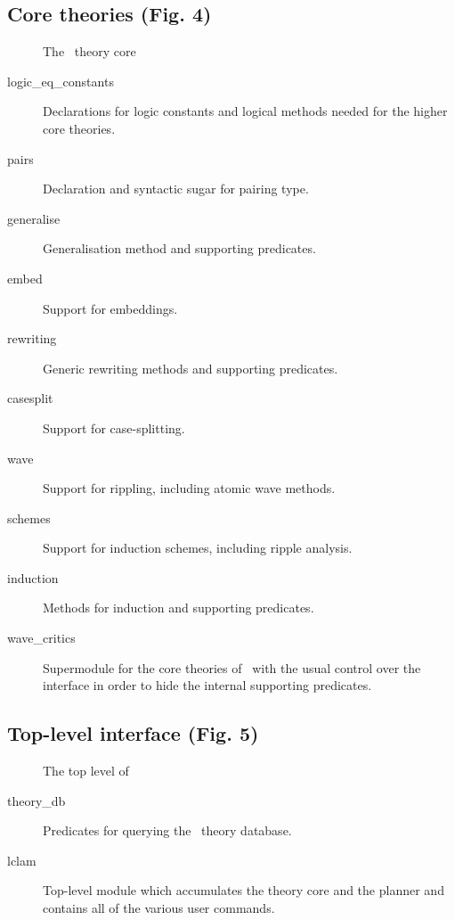 \subsection{Core theories (Fig. 4)}

\begin{figure}
\begin{center}
\end{center}
\caption{The \lclam\ theory core}
\end{figure}

\begin{description}
  
\item[logic\_eq\_constants] Declarations for logic constants and
  logical methods needed for the higher core theories.
\item[pairs] Declaration and syntactic sugar for pairing type.
\item[generalise] Generalisation method and supporting predicates.
\item[embed] Support for embeddings.
\item[rewriting] Generic rewriting methods and supporting predicates.
\item[casesplit] Support for case-splitting.
\item[wave] Support for rippling, including atomic wave methods.
\item[schemes] Support for induction schemes, including ripple analysis.
\item[induction] Methods for induction and supporting predicates.
\item[wave\_critics] Supermodule for the core theories of \lclam\ with
  the usual control over the interface in order to hide the internal
  supporting predicates.
\end{description}

\subsection{Top-level interface (Fig. 5)}

\begin{figure}
\begin{center}
\caption{The top level of \lclam}
\end{center}
\end{figure}

\begin{description}

\item[theory\_db] Predicates for querying the \lclam\ theory database.
\item[lclam] Top-level module which accumulates the theory core and
  the planner and contains all of the various user commands.

\end{description}




